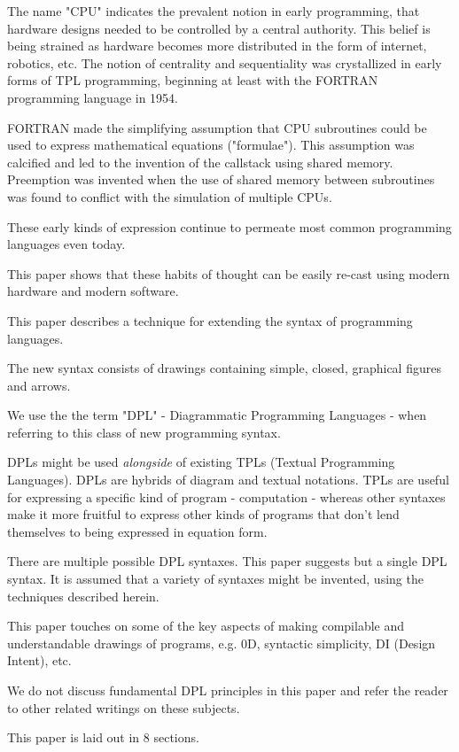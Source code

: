 \documentclass[10pt,anonymous,review]{acmart}
\begin{document}
The name "CPU" indicates the prevalent notion in early programming, that
hardware designs needed to be controlled by a central authority. This
belief is being strained as hardware becomes more distributed in the
form of internet, robotics, etc. The notion of centrality and
sequentiality was crystallized in early forms of TPL programming,
beginning at least with the FORTRAN\cite{fortran} programming language in 1954.

FORTRAN made the simplifying assumption that CPU subroutines could be
used to express mathematical equations ("formulae"). This assumption was
calcified and led to the invention of the callstack using shared memory.
Preemption was invented when the use of shared memory between
subroutines was found to conflict with the simulation of multiple CPUs.

These early kinds of expression continue to permeate most common
programming languages even today.

This paper shows that these habits of thought can be easily
re-cast using modern hardware and modern software.

This paper describes a technique for extending the syntax of programming
languages.

The new syntax consists of drawings containing simple, closed, graphical
figures and arrows.

We use the the term "DPL" - Diagrammatic Programming Languages - when
referring to this class of new programming syntax.

DPLs might be used \emph{alongside} of existing TPLs (Textual
Programming Languages). DPLs are hybrids of diagram and textual
notations. TPLs are useful for expressing a specific kind of program -
computation - whereas other syntaxes make it more fruitful to express
other kinds of programs that don't lend themselves to being expressed in
equation form.

There are multiple possible DPL syntaxes. This paper suggests but a
single DPL syntax. It is assumed that a variety of syntaxes might be
invented, using the techniques described herein.

This paper touches on some of the key aspects of making compilable and
understandable drawings of programs, e.g. 0D, syntactic simplicity, DI
(Design Intent), etc.

We do not discuss fundamental DPL principles in this paper and refer the
reader to other related writings on these subjects.

This paper is laid out in 8 sections.
\end{document}

